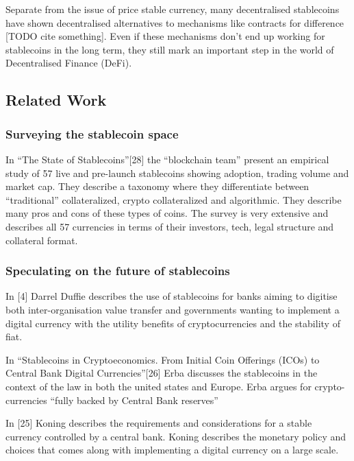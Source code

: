 \documentclass[english,]{IEEEtran}
\begin{document}
Separate from the issue of price stable currency, many decentralised
stablecoins have shown decentralised alternatives to mechanisms like
contracts for difference {[}TODO cite something{]}. Even if these
mechanisms don't end up working for stablecoins in the long term, they
still mark an important step in the world of Decentralised Finance
(DeFi).

\subsection{Related Work}\label{related-work}

\subsubsection{Surveying the stablecoin
space}\label{surveying-the-stablecoin-space}

In ``The State of Stablecoins''{[}28{]} the ``blockchain team'' present
an empirical study of 57 live and pre-launch stablecoins showing
adoption, trading volume and market cap. They describe a taxonomy where
they differentiate between ``traditional'' collateralized, crypto
collateralized and algorithmic. They describe many pros and cons of
these types of coins. The survey is very extensive and describes all 57
currencies in terms of their investors, tech, legal structure and
collateral format.

\subsubsection{Speculating on the future of
stablecoins}\label{speculating-on-the-future-of-stablecoins}

In {[}4{]} Darrel Duffie describes the use of stablecoins for banks
aiming to digitise both inter-organisation value transfer and
governments wanting to implement a digital currency with the utility
benefits of cryptocurrencies and the stability of fiat.

In ``Stablecoins in Cryptoeconomics. From Initial Coin Offerings (ICOs)
to Central Bank Digital Currencies''{[}26{]} Erba discusses the
stablecoins in the context of the law in both the united states and
Europe. Erba argues for crypto-currencies ``fully backed by Central Bank
reserves''

In {[}25{]} Koning describes the requirements and considerations for a
stable currency controlled by a central bank. Koning describes the
monetary policy and choices that comes along with implementing a digital
currency on a large scale.
\end{document}
